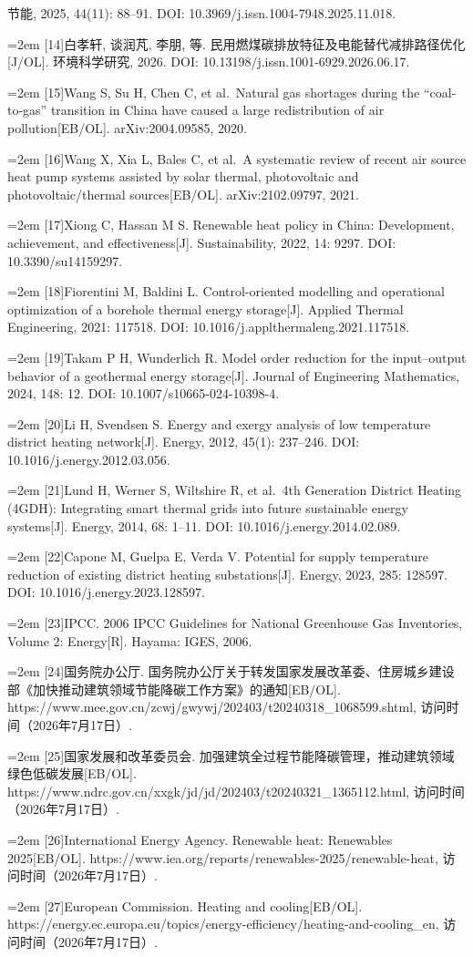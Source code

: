 \documentclass[12pt,a4paper]{article}
\newenvironment{refsectionflush}
  {\par\sloppy\setlength{\parindent}{0pt}\setlength{\parskip}{0pt}}
  {\par\fussy}
\newcommand{\refentry}[2]{%
  \par\noindent\hangindent=2em\hangafter=1
  [#1]\enspace #2\par}
\begin{document}
\begin{refsectionflush}
{节能, 2025, 44(11): 88--91. DOI: 10.3969/j.issn.1004-7948.2025.11.018.}
\refentry{14}{白孝轩, 谈润芃, 李朋, 等.
民用燃煤碳排放特征及电能替代减排路径优化{[}J/OL{]}. 环境科学研究, 2026.
DOI: 10.13198/j.issn.1001-6929.2026.06.17.}
\refentry{15}{Wang S, Su H, Chen C, et al.~Natural gas shortages during the
``coal-to-gas'' transition in China have caused a large redistribution
of air pollution{[}EB/OL{]}. arXiv:2004.09585, 2020.}
\refentry{16}{Wang X, Xia L, Bales C, et al.~A systematic review of recent
air source heat pump systems assisted by solar thermal, photovoltaic and
photovoltaic/thermal sources{[}EB/OL{]}. arXiv:2102.09797, 2021.}
\refentry{17}{Xiong C, Hassan M S. Renewable heat policy in China:
Development, achievement, and effectiveness{[}J{]}. Sustainability,
2022, 14: 9297. DOI: 10.3390/su14159297.}
\refentry{18}{Fiorentini M, Baldini L. Control-oriented modelling and
operational optimization of a borehole thermal energy storage{[}J{]}.
Applied Thermal Engineering, 2021: 117518. DOI:
10.1016/j.applthermaleng.2021.117518.}
\refentry{19}{Takam P H, Wunderlich R. Model order reduction for the
input--output behavior of a geothermal energy storage{[}J{]}. Journal of
Engineering Mathematics, 2024, 148: 12. DOI: 10.1007/s10665-024-10398-4.}
\refentry{20}{Li H, Svendsen S. Energy and exergy analysis of low temperature
district heating network{[}J{]}. Energy, 2012, 45(1): 237--246. DOI:
10.1016/j.energy.2012.03.056.}
\refentry{21}{Lund H, Werner S, Wiltshire R, et al.~4th Generation District
Heating (4GDH): Integrating smart thermal grids into future sustainable
energy systems{[}J{]}. Energy, 2014, 68: 1--11. DOI:
10.1016/j.energy.2014.02.089.}
\refentry{22}{Capone M, Guelpa E, Verda V. Potential for supply temperature
reduction of existing district heating substations{[}J{]}. Energy, 2023,
285: 128597. DOI: 10.1016/j.energy.2023.128597.}
\refentry{23}{IPCC. 2006 IPCC Guidelines for National Greenhouse Gas
Inventories, Volume 2: Energy{[}R{]}. Hayama: IGES, 2006.}
\refentry{24}{国务院办公厅. 国务院办公厅关于转发国家发展改革委、住房城乡建设部《加快推动建筑领域节能降碳工作方案》的通知{[}EB/OL{]}. https://www.mee.gov.cn/zcwj/gwywj/202403/t20240318\_1068599.shtml, 访问时间（2026年7月17日）.}
\refentry{25}{国家发展和改革委员会. 加强建筑全过程节能降碳管理，推动建筑领域绿色低碳发展{[}EB/OL{]}. https://www.ndrc.gov.cn/xxgk/jd/jd/202403/t20240321\_1365112.html, 访问时间（2026年7月17日）.}
\refentry{26}{International Energy Agency. Renewable heat: Renewables 2025{[}EB/OL{]}. https://www.iea.org/reports/renewables-2025/renewable-heat, 访问时间（2026年7月17日）.}
\refentry{27}{European Commission. Heating and cooling{[}EB/OL{]}. https://energy.ec.europa.eu/topics/energy-efficiency/heating-and-cooling\_en, 访问时间（2026年7月17日）.}
\end{refsectionflush}
\end{document}
